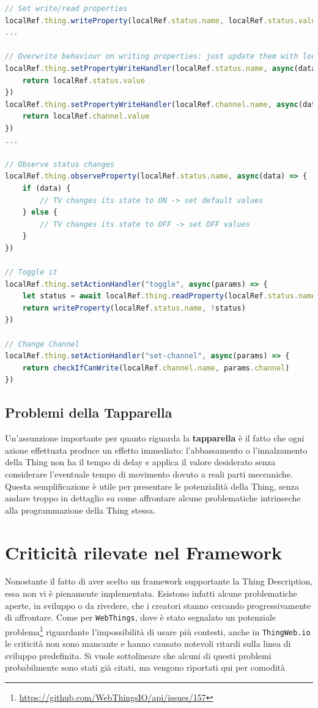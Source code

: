 \documentclass[12pt,a4paper,openright,oneside]{report}
\begin{document}
\begin{lstlisting}[language=JavaScript,caption={Solzuione definitiva per la dipendenza tra proprietà della Thing},label=lst:solution2]
// Set write/read properties
localRef.thing.writeProperty(localRef.status.name, localRef.status.value)
...

// Overwrite behaviour on writing properties: just update them with local data
localRef.thing.setPropertyWriteHandler(localRef.status.name, async(data) => {
	return localRef.status.value
})
localRef.thing.setPropertyWriteHandler(localRef.channel.name, async(data) => {
	return localRef.channel.value
})
...

// Observe status changes
localRef.thing.observeProperty(localRef.status.name, async(data) => {
	if (data) {
		// TV changes its state to ON -> set default values
	} else {
		// TV changes its state to OFF -> set OFF values
	}
})

// Toggle it
localRef.thing.setActionHandler("toggle", async(params) => {
	let status = await localRef.thing.readProperty(localRef.status.name)
	return writeProperty(localRef.status.name, !status)
})

// Change Channel
localRef.thing.setActionHandler("set-channel", async(params) => {
	return checkIfCanWrite(localRef.channel.name, params.channel)
})
\end{lstlisting}

\subsection{Problemi della Tapparella}
Un'assunzione importante per quanto riguarda la \textbf{tapparella} è il fatto che ogni azione effettuata produce un effetto immediato: l'abbassamento o l'innalzamento della Thing non ha il tempo di delay e applica il valore desiderato senza considerare l'eventuale tempo di movimento dovuto a reali parti meccaniche. Questa semplificazione è utile per presentare le potenzialità della Thing, senza andare troppo in dettaglio su come affrontare alcune problematiche intrinseche alla programmazione della Thing stessa.



\section{Criticità rilevate nel Framework}
Nonostante il fatto di aver scelto un framework supportante la Thing Description, essa non vi è pienamente implementata. Esistono infatti alcune problematiche aperte, in sviluppo o da rivedere, che i creatori stanno cercando progressivamente di affrontare. Come per \texttt{WebThings}, dove è stato segnalato un potenziale problema\footnote{\url{https://github.com/WebThingsIO/api/issues/157}} riguardante l'impossibilità di usare più contesti, anche in \texttt{ThingWeb.io} le criticità non sono mancante e hanno causato notevoli ritardi sulla linea di sviluppo predefinita. Si vuole sottolineare che alcuni di questi problemi probabilmente sono stati già citati, ma vengono riportati qui per comodità
\end{document}
